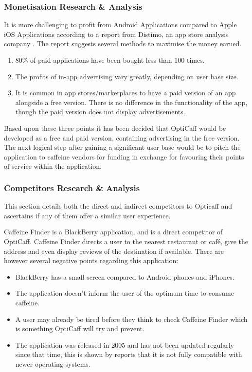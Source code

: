 \subsubsection{Monetisation Research \& Analysis}
It is more challenging to profit from Android Applications compared to Apple iOS Applications according to a report from Distimo, an app store analysis company \cite{monetisiation}. 
The report suggests several methods to maximise the money earned.

\begin{enumerate}
	\item{80\% of paid applications have been bought less than 100 times.}
	\item{The profits of in-app advertising vary greatly, depending on user base size.}
	\item{It is common in app stores/marketplaces to have a paid version of an app alongside a free version. There is no difference in the functionality of the app, though the paid version does not display advertisements.}
\end{enumerate}

Based upon these three points it has been decided that OptiCaff would be developed as a free and paid version, containing advertising in the free version.
The next logical step after gaining a significant user base would be to pitch the application to caffeine vendors for funding in exchange for favouring their points of service within the application.  

\subsubsection{Competitors Research \& Analysis}
\label{sec:competitors}
This section details both the direct and indirect competitors to Opticaff and ascertains if any of them offer a similar user experience. 

Caffeine Finder is a BlackBerry application, and is a direct competitor of OptiCaff. 
Caffeine Finder directs a user to the nearest restaurant or café, give the address and even display reviews of the destination if available. 
There are however several negative points regarding this application:
\begin{itemize}
	\item{BlackBerry has a small screen compared to Android phones and iPhones.} 
	\item{The application doesn’t inform the user of the optimum time to consume caffeine.}
	\item{A user may already be tired before they think to check Caffeine Finder which is something OptiCaff will try and prevent.} 
	\item{The application was released in 2005 and has not been updated regularly since that time, this is shown by reports that it is not fully compatible with newer operating systems.}
\end{itemize}

